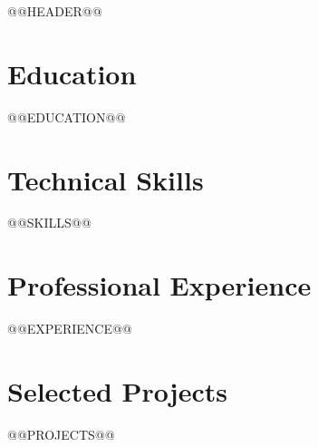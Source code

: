 \documentclass[letterpaper,11pt]{article}
\begin{document}
@@HEADER@@
\section{Education}
@@EDUCATION@@
\section{Technical Skills}
@@SKILLS@@
\section{Professional Experience}
@@EXPERIENCE@@
\section{Selected Projects}
@@PROJECTS@@
\end{document}
